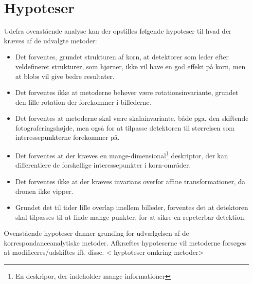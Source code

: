 \section{Hypoteser}
Udefra ovenstående analyse kan der opstilles følgende hypoteser til hvad der kræves af de udvalgte metoder:
\begin{itemize}
\item{ Det forventes, grundet strukturen af korn, at detektorer som leder efter veldefineret strukturer, som hjørner, ikke vil have en god effekt på korn, men at blobs vil give bedre resultater.}
\item{ Det forventes ikke at metoderne behøver være rotationsinvariante, grundet den lille rotation der forekommer i billederne. }
\item{Det forventes at metoderne skal være skalainvariante, både pga. den skiftende fotograferingshøjde, men også for at tilpasse detektoren til størrelsen som interessepunkterne forekommer på.}
\item{Det forventes at der kræves en mange-dimensional\footnote{En deskripor, der indeholder mange informationer} deskriptor, der kan differentiere de forskellige interessepunkter i korn-områder.}
\item{ Det forventes ikke at der kræves invarians overfor affine transformationer, da dronen ikke vipper. }
\item{Grundet det til tider lille overlap imellem billeder, forventes det at detektoren skal tilpasses til at finde mange punkter, for at sikre en repeterbar detektion.}
\end{itemize}
Ovenstående hypoteser danner grundlag for udvælgelsen af de korrespondanceanalytiske metoder. Afkræftes hypoteserne vil metoderne forsøges at modificeres/udskiftes ift. disse.
< hyptoteser omkring metoder>